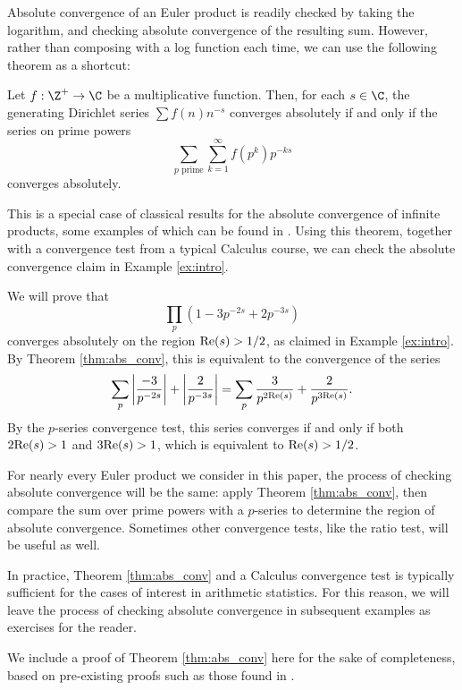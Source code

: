 \documentclass[12pt]{amsart}
\newenvironment{BOXexample}{
\begin{exbox}\mbox{}
\begin{example}
}
{
\end{example}
\end{exbox}
}
\theoremstyle{plain}
\begin{document}
Absolute convergence of an Euler product is readily checked by taking the logarithm, and checking absolute convergence of the resulting sum. However, rather than composing with a log function each time, we can use the following theorem as a shortcut:

\begin{theorem}\label{thm:abs_conv}
    Let $f:\Z^+\to \C$ be a multiplicative function. Then, for each $s\in \C$, the generating Dirichlet series $\sum f(n) n^{-s}$ converges absolutely if and only if the series on prime powers
    \[
    \sum_{p\text{ prime}}\sum_{k=1}^{\infty} f(p^k) p^{-ks}
    \]
    converges absolutely.
\end{theorem}

This is a special case of classical results for the absolute convergence of infinite products, some examples of which can be found in \cite[Chapter VII]{knopp1990}. Using this theorem, together with a convergence test from a typical Calculus course, we can check the absolute convergence claim in Example \ref{ex:intro}.

\begin{BOXexample}\label{ex:intro_abs_conv}
    We will prove that
    \[
    \prod_p (1 -3p^{-2s} + 2p^{-3s})
    \]
    converges absolutely on the region ${\rm Re}(s) > 1/2$, as claimed in Example \ref{ex:intro}. By Theorem \ref{thm:abs_conv}, this is equivalent to the convergence of the series
    \[
    \sum_p \left\lvert\frac{-3}{p^{-2s}}\right\rvert + \left\lvert\frac{2}{p^{-3s}}\right\rvert = \sum_p \frac{3}{p^{2{\rm Re}(s)}} + \frac{2}{p^{3{\rm Re}(s)}}.
    \]
    By the $p$-series convergence test, this series converges if and only if both $2{\rm Re}(s) > 1$ and $3{\rm Re}(s) > 1$, which is equivalent to ${\rm Re}(s) > 1/2$.
\end{BOXexample}

For nearly every Euler product we consider in this paper, the process of checking absolute convergence will be the same: apply Theorem \ref{thm:abs_conv}, then compare the sum over prime powers with a $p$-series to determine the region of absolute convergence. Sometimes other convergence tests, like the ratio test, will be useful as well.

In practice, Theorem \ref{thm:abs_conv} and a Calculus convergence test is typically sufficient for the cases of interest in arithmetic statistics. For this reason, we will leave the process of checking absolute convergence in subsequent examples as exercises for the reader.

We include a proof of Theorem \ref{thm:abs_conv} here for the sake of completeness, based on pre-existing proofs such as those found in \cite{knopp1990}.
\end{document}
